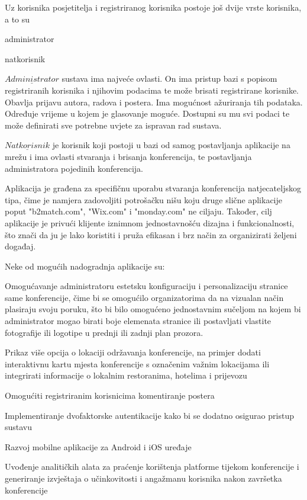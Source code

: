 		Uz korisnika posjetitelja i registriranog korisnika postoje još dvije vrste korisnika, a to su
		\begin{packed_item}
			\item administrator
			\item natkorisnik
		\end{packed_item}
		
		$\underline{Administrator}$ sustava ima najveće ovlasti. On ima pristup bazi s popisom registriranih korisnika i njihovim podacima te može brisati registrirane korisnike. Obavlja prijavu autora, radova i postera. Ima mogućnost ažuriranja tih podataka. Određuje vrijeme u kojem je glasovanje moguće. Dostupni su mu svi podaci te može definirati sve potrebne uvjete za ispravan rad sustava.
		
		$\underline{Natkorisnik}$ je korisnik koji postoji u bazi od samog postavljanja aplikacije na mrežu i ima ovlasti stvaranja i brisanja konferencija, te postavljanja administratora pojedinih konferencija.
		
		Aplikacija je građena za specifičnu uporabu stvaranja konferencija natjecateljskog tipa, čime je namjera zadovoljiti potrošačku nišu koju druge slične aplikacije poput "b2match.com", "Wix.com" i "monday.com" ne ciljaju. Također, cilj aplikacije je privući klijente iznimnom jednostavnošću dizajna i funkcionalnosti, što znači da ju je lako koristiti i pruža efikasan i brz način za organizirati željeni događaj.
		
		Neke od mogućih nadogradnja aplikacije su: 
		\begin{packed_item}
			\item Omogućavanje administratoru estetsku konfiguraciju i personalizaciju stranice same konferencije, čime bi se omogućilo organizatorima da na vizualan način plasiraju svoju poruku, što bi bilo omogućeno jednostavnim sučeljom na kojem bi administrator mogao birati boje elemenata stranice ili postavljati vlastite fotografije ili logotipe u prednji ili zadnji plan prozora.
			\item Prikaz više opcija o lokaciji održavanja konferencije, na primjer dodati  interaktivnu kartu  mjesta konferencije s označenim važnim lokacijama ili integrirati informacije o lokalnim restoranima, hotelima i prijevozu
			 \item Omogućiti registriranim korisnicima komentiranje postera
			 \item Implementiranje dvofaktorske autentikacije kako bi se dodatno osigurao pristup sustavu
			 \item Razvoj  mobilne aplikacije za Android i iOS uređaje 
			 \item Uvođenje analitičkih alata  za praćenje korištenja platforme tijekom konferencije i generiranje izvještaja o učinkovitosti i angažmanu korisnika nakon završetka konferencije
		\end{packed_item}

		\eject
		
